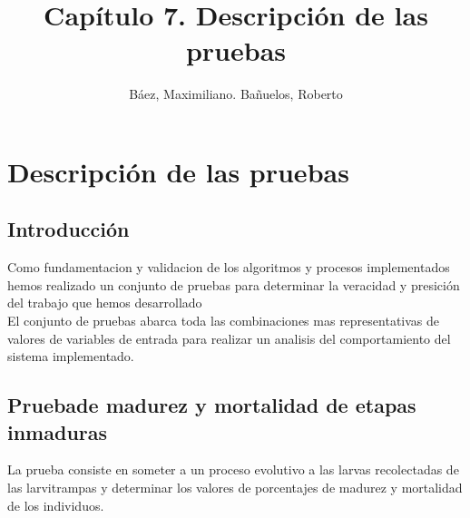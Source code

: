 \documentclass[a4paper]{article}
\title{Capítulo 7. Descripción de las pruebas}
\author{Báez, Maximiliano. Bañuelos, Roberto}
\date{}
\begin{document}
\maketitle

\section{ Descripción de las pruebas}

\subsection{Introducción}

Como fundamentacion y validacion de los algoritmos y procesos implementados
hemos realizado un conjunto de pruebas para determinar la veracidad y presición del 
trabajo que hemos desarrollado\\

El conjunto de pruebas abarca toda las combinaciones mas representativas
de valores de variables de entrada para realizar un analisis del comportamiento 
del sistema implementado.\\

\subsection{Pruebade madurez y mortalidad de etapas inmaduras}

La prueba consiste en someter a un proceso evolutivo a las larvas 
recolectadas de las larvitrampas y determinar los valores de porcentajes 
de madurez y mortalidad de los individuos.\\
\end{document}
